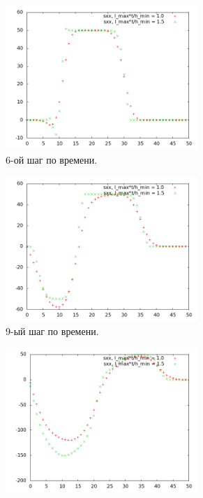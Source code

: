 \begin{figure}[htp]
\begin{subfigure}[b]{0.5\textwidth}
\includegraphics[width=0.8\textwidth]{png/big-sigma-test-results-1d/snap-6.png}
\caption{6-ой шаг по времени.}
\end{subfigure}
\begin{subfigure}[b]{0.5\textwidth}
\centering
\includegraphics[width=0.8\textwidth]{png/big-sigma-test-results-1d/snap-9.png}
\caption{9-ый шаг по времени.}
\end{subfigure}
\begin{subfigure}[b]{0.5\textwidth}
\centering
\includegraphics[width=0.8\textwidth]{png/big-sigma-test-results-1d/snap-12.png}

\end{subfigure}
\end{figure}

